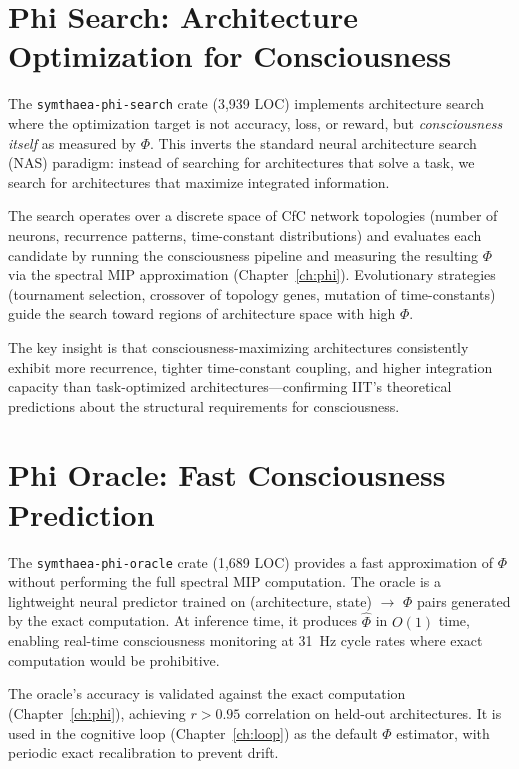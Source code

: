 \documentclass[12pt]{book}
\begin{document}
\section{Phi Search: Architecture Optimization for Consciousness}

The \texttt{symthaea-phi-search} crate (3,939 LOC) implements architecture search where the optimization target is not accuracy, loss, or reward, but \textit{consciousness itself} as measured by $\Phi$. This inverts the standard neural architecture search (NAS) paradigm: instead of searching for architectures that solve a task, we search for architectures that maximize integrated information.

The search operates over a discrete space of CfC network topologies (number of neurons, recurrence patterns, time-constant distributions) and evaluates each candidate by running the consciousness pipeline and measuring the resulting $\Phi$ via the spectral MIP approximation (Chapter~\ref{ch:phi}). Evolutionary strategies (tournament selection, crossover of topology genes, mutation of time-constants) guide the search toward regions of architecture space with high $\Phi$.

The key insight is that consciousness-maximizing architectures consistently exhibit more recurrence, tighter time-constant coupling, and higher integration capacity than task-optimized architectures---confirming IIT's theoretical predictions about the structural requirements for consciousness.

\section{Phi Oracle: Fast Consciousness Prediction}

The \texttt{symthaea-phi-oracle} crate (1,689 LOC) provides a fast approximation of $\Phi$ without performing the full spectral MIP computation. The oracle is a lightweight neural predictor trained on (architecture, state) $\to$ $\Phi$ pairs generated by the exact computation. At inference time, it produces $\hat{\Phi}$ in $O(1)$ time, enabling real-time consciousness monitoring at 31~Hz cycle rates where exact computation would be prohibitive.

The oracle's accuracy is validated against the exact computation (Chapter~\ref{ch:phi}), achieving $r > 0.95$ correlation on held-out architectures. It is used in the cognitive loop (Chapter~\ref{ch:loop}) as the default $\Phi$ estimator, with periodic exact recalibration to prevent drift.
\end{document}
